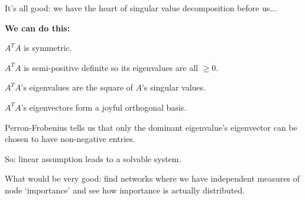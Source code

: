     \alert{It's all good:} we have the heart
    of singular value decomposition before us...
  
  

  \textbf{We can do this:}

  
  
    $A^{T} A$ is symmetric.
  
    $A^{T} A$ is semi-positive definite
    so its eigenvalues are all $\ge 0$.
  
    $A^{T} A$'s eigenvalues are 
    the square of $A$'s singular values.
  
    $A^{T} A$'s eigenvectors
    form a joyful orthogonal basis.
  
    Perron-Frobenius tells us that 
    only the dominant eigenvalue's eigenvector
    can be chosen to have non-negative entries.
  
    So: linear assumption leads to a solvable system.
  
    What would be very good: find networks where
    we have independent measures of node `importance'
    and see how importance is actually distributed.
  



\begin{comment}
  
\section{Appendix}

  \textbf{Perron-Frobenius}

  
   
    Simple proof for symmetric matrices
  



\section{Summary}

  

  
   
  



\end{comment}
